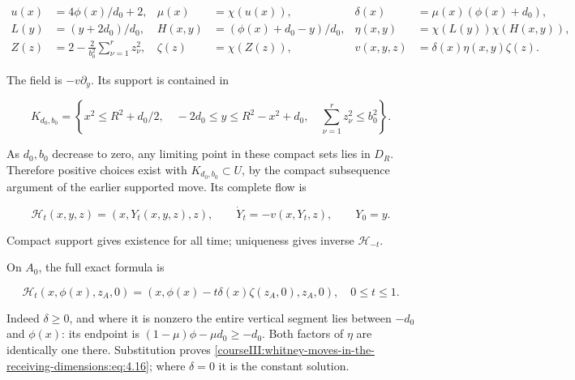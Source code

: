 \begin{equation}
\begin{aligned}
 u(x)&=4\phi(x)/d_0+2,&
 \mu(x)&=\chi(u(x)),&
 \delta(x)&=\mu(x)(\phi(x)+d_0),\\
 L(y)&=(y+2d_0)/d_0,&
 H(x,y)&=(\phi(x)+d_0-y)/d_0,&
 \eta(x,y)&=\chi(L(y))\chi(H(x,y)),\\
 Z(z)&=2-\frac{2}{b_0^2}\sum_{\nu=1}^{r}z_\nu^2,&
 \zeta(z)&=\chi(Z(z)),&
 v(x,y,z)&=\delta(x)\eta(x,y)\zeta(z).
 \end{aligned}
 \label{courseIII:whitney-moves-in-the-receiving-dimensions:eq:4.13}
\end{equation}

The field is \(-v\partial_y\). Its support is contained in

\begin{equation}
K_{d_0,b_0}=
 \left\{x^2\leq R^2+d_0/2,\quad
 -2d_0\leq y\leq R^2-x^2+d_0,\quad
 \sum_{\nu=1}^{r}z_\nu^2\leq b_0^2\right\}.
 \label{courseIII:whitney-moves-in-the-receiving-dimensions:eq:4.14}
\end{equation}

As \(d_0,b_0\) decrease to zero, any limiting point in these compact sets lies in \(D_R\). Therefore positive choices exist with \(K_{d_0,b_0}\subset U\), by the compact subsequence argument of the earlier supported move. Its complete flow is

\begin{equation}
\mathcal H_t(x,y,z)=(x,Y_t(x,y,z),z),\qquad
 \dot Y_t=-v(x,Y_t,z),\qquad Y_0=y.
 \label{courseIII:whitney-moves-in-the-receiving-dimensions:eq:4.15}
\end{equation}

Compact support gives existence for all time; uniqueness gives inverse \(\mathcal H_{-t}\).

On \(A_0\), the full exact formula is

\begin{equation}
\mathcal H_t(x,\phi(x),z_A,0)
  =(x,\phi(x)-t\delta(x)\zeta(z_A,0),z_A,0),
 \quad0\leq t\leq1.
 \label{courseIII:whitney-moves-in-the-receiving-dimensions:eq:4.16}
\end{equation}

Indeed \(\delta\geq0\), and where it is nonzero the entire vertical segment lies between \(-d_0\) and \(\phi(x)\): its endpoint is
\((1-\mu)\phi-\mu d_0\geq-d_0\).
Both factors of \(\eta\) are identically one there. Substitution proves \eqref{courseIII:whitney-moves-in-the-receiving-dimensions:eq:4.16}; where \(\delta=0\) it is the constant solution.

